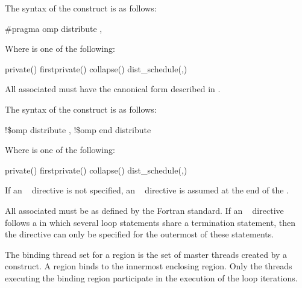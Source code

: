 \syntax
\ccppspecificstart
The syntax of the  construct is as follows:

\begin{boxedcode}
\#pragma omp distribute \plc{[clause[ [},\plc{] clause] ... ] new-line}
\end{boxedcode}

Where  is one of the following:

\begin{indentedcodelist}
private()
firstprivate()
collapse()
dist\_schedule(\plc{kind[},\plc{ chunk\_size]})
\end{indentedcodelist}

All associated  must have the canonical form described in 
.
\ccppspecificend
\bigskip

\fortranspecificstart
The syntax of the  construct is as follows:

\begin{boxedcode}
!\$omp distribute \plc{[clause[ [},\plc{] clause] ... ]}
\plc{[}!\$omp end distribute\plc{]}
\end{boxedcode}

Where  is one of the following:

\begin{indentedcodelist}
private()
firstprivate()
collapse()
dist\_schedule(\plc{kind[},\plc{ chunk\_size]})
\end{indentedcodelist}

If an ~ directive is not specified, an ~ directive 
is assumed at the end of the .

All associated  must be  as defined by the Fortran standard. If an 
~ directive follows a  in which several loop statements share a  
termination statement, then the directive can only be specified for the outermost of these 
 statements.
\fortranspecificend

\binding
The binding thread set for a  region is the set of master threads created by 
a  construct. A  region binds to the innermost enclosing  
region. Only the threads executing the binding  region participate in the 
execution of the loop iterations.

